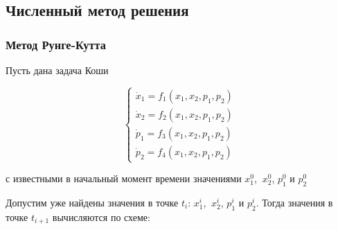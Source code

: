 \documentclass[a4paper,12pt]{article}
\begin{document}
\subsection{Численный метод решения}

\subsubsection{Метод Рунге-Кутта}

Пусть дана задача Коши

\begin{equation*}
  \begin{cases}
    \dot{x}_1=f_1(x_1,x_2,p_1,p_2) \\
    \dot{x}_2=f_2(x_1,x_2,p_1,p_2) \\
    \dot{p}_1=f_3(x_1,x_2,p_1,p_2) \\
    \dot{p}_2=f_4(x_1,x_2,p_1,p_2)
  \end{cases}
\end{equation*}

с известными в начальный момент времени значениями \(x_1^0\),
\(\ x_2^0\), \(p_1^0\) и \(p_2^0\)

Допустим уже найдены значения в точке \(t_i\): \(x_1^i\), \(\ x_2^i\),
\(p_1^i\) и \(p_2^i\). Тогда значения в точке \(t_{i+1}\) вычисляются по
схеме:
\end{document}
